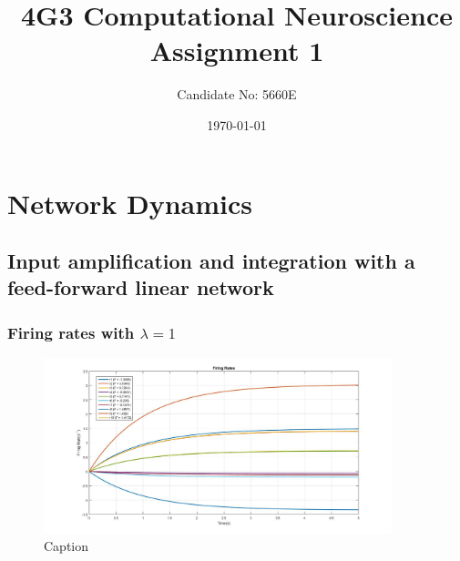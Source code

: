 \documentclass{article}
\title{4G3 Computational Neuroscience Assignment 1 } %
\author{Candidate No: \textsc{5660E}} %
\date{\today} %
\begin{document}
	
	\maketitle %
	

	
	
	
\section{Network Dynamics}
	
\subsection{Input amplification and integration with a feed-forward linear network}


	
	\subsubsection{Firing rates with $\lambda = 1$}
	
		\begin{figure}[H] 
			\begin{center}
				\includegraphics[width=0.9\textwidth]{Section1/Part1/Q1a.jpg}
				\caption{Caption \label{Q1a}}
								\end{center}
		\end{figure}
	
\end{document}
